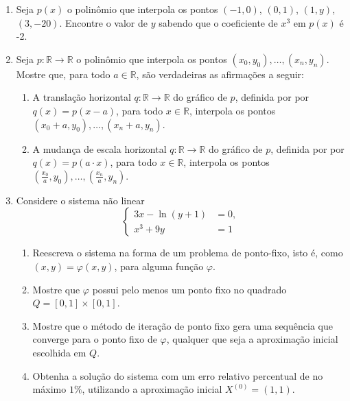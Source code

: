 \documentclass[12pt,a4paper]{article}
\newcommand*\R{\mathbb{R}}
\begin{document}
\begin{enumerate}
\item Seja $p(x)$ o polinômio que interpola os pontos $(-1, 0)$, $(0, 1)$, $(1, y)$, $(3, -20)$. Encontre o valor de $y$ sabendo que o coeficiente de $x^3$ em $p(x)$ é -2.

\item Seja $p:\R \to \R$ o polinômio que interpola os pontos $(x_0, y_0), \ldots, (x_n, y_n)$. Mostre que, para todo $a \in \R$, são verdadeiras as afirmações a seguir:
\begin{enumerate}
\item A translação horizontal $q:\R \to \R$ do gráfico de $p$, definida por por $q(x) = p(x - a)$, para todo $x \in \R$, interpola os pontos $(x_0+a, y_0), \ldots, (x_n+a, y_n)$.
\item A mudança de escala horizontal $q:\R \to \R$ do gráfico de $p$, definida por por $q(x) = p(a \cdot x)$, para todo $x \in \R$, interpola os pontos $(\frac{x_0}{a}, y_0), \ldots, (\frac{x_n}{a}, y_n)$.
\end{enumerate}

\item Considere o sistema não linear
\[
\begin{cases}
3x - \ln(y + 1) &= 0,\\
x^3 + 9y &= 1
\end{cases}
\]
\begin{enumerate}
\item Reescreva o sistema na forma de um problema de ponto-fixo, isto é, como $(x,y) = \varphi(x,y)$, para alguma função $\varphi$.
\item Mostre que $\varphi$ possui pelo menos um ponto fixo no quadrado $Q = [0,1] \times [0,1]$.
\item Mostre que o método de iteração de ponto fixo gera uma sequência que converge para o ponto fixo de $\varphi$, qualquer que seja a aproximação inicial escolhida em $Q$.
\item Obtenha a solução do sistema com um erro relativo percentual de no máximo $1\%$, utilizando a aproximação inicial $X^{(0)} = (1, 1)$.
\end{enumerate}
\end{enumerate}


\newpage
\end{document}
